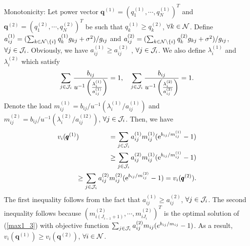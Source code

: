 \documentclass[journal]{IEEEtran}
\begin{document}
Monotonicity:
Let power vector $\pmb{q}^{(1)}=(q_1^{(1)}, \cdots, q_N^{(1)})^T$
and $\pmb{q}^{(2)}=(q_1^{(2)}, \cdots, q_N^{(2)})^T$ be such
that $q_k^{(1)} \geq q_k^{(2)}$, $\forall k \in \cal{N}$.
Define
$a_{ij}^{(1)}=({\sum_{k \in {\cal{N}}\setminus \{i\}}  q_k^{(1)} g_{kj} +\sigma ^2})/
{g_{ij}}$ and
$a_{ij}^{(2)}=({\sum_{k \in {\cal{N}}\setminus \{i\}}  q_k^{(2)} g_{kj} +\sigma ^2})/
{g_{ij}}$, $\forall j \in {\cal{J}}_i$.
Obviously, we have $a_{ij}^{(1)} \geq a_{ij}^{(2)}$ , $\forall j \in {\cal{J}}_i$.
We also define ${ \lambda_i^{(1)}}$ and ${ \lambda_i^{(2)}}$ which satisfy
\begin{equation}\label{eqnarray11}
\sum_{j \in {\cal{J}}_i }
\frac{b_{ij}} { u^{-1} \left(\frac { \lambda_i^{(1)}} {a_{ij}^{(1)}} \right)}=1, \quad
\sum_{j \in {\cal{J}}_i }
\frac{b_{ij}} { u^{-1} \left(\frac { \lambda_i^{(2)}} {a_{ij}^{(2)}} \right)}=1.
\end{equation}
Denote the load $m_{ij}^{(1)}={b_{ij}}/ { u^{-1} ( { \lambda_i^{(1)}} /{a_{ij}^{(1)}} )}$
and $m_{ij}^{(2)}={b_{ij}}/ { u^{-1} ( { \lambda_i^{(2)}} /{a_{ij}^{(12)}} )}$,
$\forall j \in {\cal{J}}_i$.
Then, we have
\begin{eqnarray}\label{eqnarray12}
v_i(\pmb{q}^{(1)})
&&\!\!\!\!\!\!\!=\sum_{j \in {\cal{J}}_i }
a_{ij}^{(1)} m_{ij}^{(1)}
(\text e^{b_{ij}/ m_{ij}^{(1)} }-1 )
\nonumber \\
&&\!\!\!\!\!\!\!\geq
\sum_{j \in {\cal{J}}_i }
a_{ij}^{(2)} m_{ij}^{(1)}
( \text e^{b_{ij}/ m_{ij}^{(1)} }-1 )\nonumber \\
&&\!\!\!\!\!\!\!\geq
\sum_{j \in {\cal{J}}_i }
a_{ij}^{(2)} m_{ij}^{(2)}
( \text e^{b_{ij}/ m_{ij}^{(2)} }-1 )=v_i(\pmb{q}^{(2)}).
\end{eqnarray}
The first inequality follows from the fact that $a_{ij}^{(1)} \!\geq\! a_{ij}^{(2)}$, $\forall j \in {\cal{J}}_i$.
The second inequality follows
because $(m_{i (J_{i-1}+1)}^{(2)}, \cdots, m_{i J_{i}}^{(2)})^T$
is the optimal solution of (\ref{max1_3}) with objective function
$\sum_{j \in {\cal{J}}_i }
a_{ij}^{(2)} m_{ij}( e^{b_{ij}/ m_{ij} }-1 )$.
As a result,
${v}_i(\pmb{q}^{(1)}) \geq {v}_i(\pmb{q}^{(2)})$,
$\forall i \in {\cal{N}}$.
\end{document}
